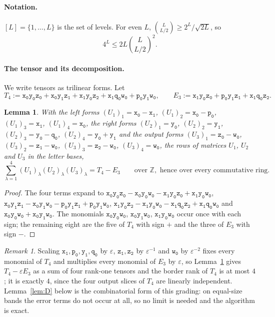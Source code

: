 \documentclass[11pt]{article}
\newtheorem{lemma}[theorem]{Lemma}
\theoremstyle{definition}
\theoremstyle{remark}
\newtheorem{remark}[theorem]{Remark}
\newcommand{\Z}{\mathbb{Z}}
\newcommand{\eps}{\varepsilon}
\newcommand{\tl}[1]{\mathtt{#1}}
\begin{document}
\paragraph{Notation.} $[L]=\{1,\dots,L\}$ is the set of levels. For even $L$, $\binom L{L/2}\ge2^L/\sqrt{2L}$, so
\begin{equation}\label{eq:binom}
4^L\le2L\binom L{L/2}^2.
\end{equation}

\paragraph{The tensor and its decomposition.} We write tensors as trilinear forms. Let
\[
T_4:=\tl{x_0y_0z_0}+\tl{x_0y_1z_1}+\tl{x_1y_0z_2}+\tl{x_1q_0w_0}+\tl{p_0y_1w_0},\qquad E_3:=\tl{x_1y_0z_0}+\tl{p_0y_1z_1}+\tl{x_1q_0z_2}.
\]

\begin{lemma}\label{lem:P3}
With the left forms $(U_1)_1=\tl{x_0}-\tl{x_1}$, $(U_1)_2=\tl{x_0}-\tl{p_0}$, $(U_1)_3=\tl{x_1}$, $(U_1)_4=\tl{x_0}$, the right forms $(U_2)_1=\tl{y_0}$, $(U_2)_2=\tl{y_1}$, $(U_2)_3=\tl{y_0}-\tl{q_0}$, $(U_2)_4=\tl{y_0}+\tl{y_1}$ and the output forms $(U_3)_1=\tl{z_0}-\tl{w_0}$, $(U_3)_2=\tl{z_1}-\tl{w_0}$, $(U_3)_3=\tl{z_2}-\tl{w_0}$, $(U_3)_4=\tl{w_0}$, the rows of matrices $U_1$, $U_2$ and $U_3$ in the letter bases,
\[
\sum_{\lambda=1}^4(U_1)_\lambda(U_2)_\lambda(U_3)_\lambda=T_4-E_3\qquad\text{over }\Z,\text{ hence over every commutative ring.}
\]
\end{lemma}

\begin{proof}
The four terms expand to $\tl{x_0y_0z_0}-\tl{x_0y_0w_0}-\tl{x_1y_0z_0}+\tl{x_1y_0w_0}$, $\tl{x_0y_1z_1}-\tl{x_0y_1w_0}-\tl{p_0y_1z_1}+\tl{p_0y_1w_0}$, $\tl{x_1y_0z_2}-\tl{x_1y_0w_0}-\tl{x_1q_0z_2}+\tl{x_1q_0w_0}$ and $\tl{x_0y_0w_0}+\tl{x_0y_1w_0}$. The monomials $\tl{x_0y_0w_0}$, $\tl{x_0y_1w_0}$, $\tl{x_1y_0w_0}$ occur once with each sign; the remaining eight are the five of $T_4$ with sign $+$ and the three of $E_3$ with sign $-$.
\end{proof}

\begin{remark}\label{rem:border}
Scaling $\tl{x_1},\tl{p_0},\tl{y_1},\tl{q_0}$ by $\eps$, $\tl{z_1},\tl{z_2}$ by $\eps^{-1}$ and $\tl{w_0}$ by $\eps^{-2}$ fixes every monomial of $T_4$ and multiplies every monomial of $E_3$ by $\eps$, so Lemma~\ref{lem:P3} gives $T_4-\eps E_3$ as a sum of four rank-one tensors and the border rank of $T_4$ is at most $4$; it is exactly $4$, since the four output slices of $T_4$ are linearly independent. Lemma~\ref{lem:D} below is the combinatorial form of this grading: on equal-size bands the error terms do not occur at all, so no limit is needed and the algorithm is exact.
\end{remark}
\end{document}
